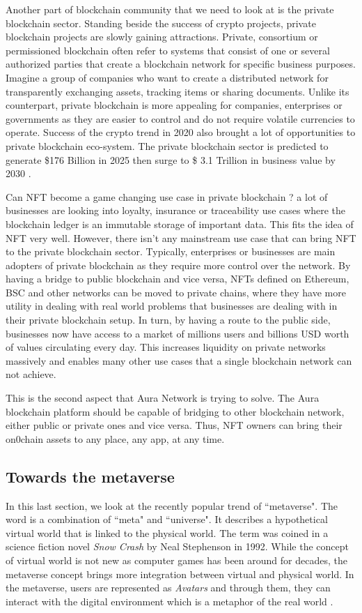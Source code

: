 \documentclass[12pt]{article}
\begin{document}
Another part of blockchain community that we need to look at is the private blockchain sector. Standing beside the success of crypto projects, private blockchain projects are slowly gaining attractions. Private, consortium or permissioned blockchain often refer to systems that consist of one or several authorized parties that create a blockchain network for specific business purposes. Imagine a group of companies who want to create a distributed network for transparently exchanging assets, tracking items or sharing documents. Unlike its counterpart, private blockchain is more appealing for companies, enterprises or governments as they are easier to control and do not require volatile currencies to operate. Success of the crypto trend in 2020 also brought a lot of opportunities to private blockchain eco-system. The private blockchain sector is predicted to generate \$176 Billion in 2025 then surge to  \$ 3.1 Trillion in business value by 2030 \cite{privatebc}. 

Can NFT become a game changing use case in private blockchain ? a lot of businesses are looking into loyalty, insurance or traceability use cases where the blockchain ledger is an immutable storage of important data. This fits the idea of NFT very well. However, there isn't any mainstream use case that can bring NFT to the private blockchain sector. Typically, enterprises or businesses are main adopters of private blockchain as they  require more control over the network. By having a bridge to public blockchain and vice versa, NFTs defined on Ethereum, BSC and other networks can be moved to private chains, where they have more utility in dealing with real world problems that businesses are dealing with in their private blockchain setup. In turn, by having a route to the public side, businesses now have access to a market of millions users and billions USD worth of values circulating every day. This increases liquidity on private networks massively and enables many other use cases that a single blockchain network can not achieve.

This is the second aspect that Aura Network is trying to solve. The Aura blockchain platform should be capable of bridging to other blockchain network, either public or private ones and vice versa. Thus, NFT owners can bring their on0chain assets to any place, any app, at any time. 

\subsection{Towards the metaverse}
In this last section, we look at the recently popular trend of ``metaverse". The word is a combination of ``meta" and ``universe". It describes a hypothetical virtual world that is linked to the physical world. The term was coined in a science fiction novel \emph{Snow Crash} by Neal Stephenson in 1992. While the concept of virtual world is not new as computer games has been around for decades, the metaverse concept brings more integration between virtual and physical world. In the metaverse, users are represented as \emph{Avatars} and through them, they can interact with the digital environment which is a metaphor of the real world \cite{lee2021all}.
\end{document}
